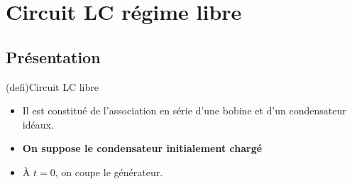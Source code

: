\documentclass[../../main/main.tex]{subfiles}
\begin{document}
\section{Circuit LC régime libre}
\label{sec:lclibre}

\subsection{Présentation}

\begin{tcb*}[sidebyside, righthand ratio=.30](defi){Circuit LC libre}
	\begin{itemize}
		\item Il est constitué de l'association en série d'une bobine et d'un
		      condensateur idéaux.
		\item \textbf{On suppose le condensateur initialement chargé}
		\item À $t=0$, on coupe le générateur.
	\end{itemize}
	\tcblower
	\begin{center}
	\end{center}
\end{tcb*}
\end{document}
